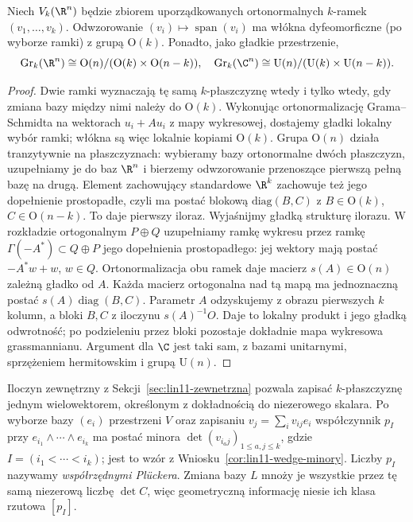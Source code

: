 \begin{stwierdzenie}
\label{prop:lin29-grass-stiefel}
Niech $V_k(\R^n)$ będzie zbiorem uporządkowanych
ortonormalnych $k$-ramek $(v_1,\ldots,v_k)$.
Odwzorowanie $(v_i)\mapsto\operatorname{span}(v_i)$ ma włókna dyfeomorficzne (po wyborze ramki)
z grupą $\mathrm O(k)$.
Ponadto, jako gładkie przestrzenie,
\[
 \operatorname{Gr}_k(\R^n)
   \cong\mathrm O(n)/(\mathrm O(k)\times\mathrm O(n-k)),
\quad
 \operatorname{Gr}_k(\C^n)
   \cong\mathrm U(n)/(\mathrm U(k)\times\mathrm U(n-k)).
\]
\end{stwierdzenie}
\begin{proof}
Dwie ramki wyznaczają tę samą $k$-płaszczyznę wtedy
i tylko wtedy, gdy zmiana bazy między nimi należy do
$\mathrm O(k)$. Wykonując ortonormalizację Grama--Schmidta
na wektorach $u_i+Au_i$ z mapy wykresowej, dostajemy
gładki lokalny wybór ramki; włókna są więc lokalnie
kopiami $\mathrm O(k)$. Grupa $\mathrm O(n)$ działa
tranzytywnie na płaszczyznach: wybieramy bazy ortonormalne
dwóch płaszczyzn, uzupełniamy je do baz $\R^n$ i bierzemy
odwzorowanie przenoszące pierwszą pełną bazę na drugą.
Element zachowujący standardowe $\R^k$ zachowuje też
jego dopełnienie prostopadłe, czyli ma postać blokową
$\mathrm{diag}(B,C)$ z $B\in\mathrm O(k)$,
$C\in\mathrm O(n-k)$. To daje pierwszy iloraz.
Wyjaśnijmy gładką strukturę ilorazu. W rozkładzie ortogonalnym
$P\oplus Q$ uzupełniamy ramkę wykresu przez ramkę
$\Gamma(-A^*)\subset Q\oplus P$ jego dopełnienia prostopadłego:
jej wektory mają postać $-A^*w+w$, $w\in Q$.
Ortonormalizacja obu ramek daje macierz $s(A)\in\mathrm O(n)$
zależną gładko od $A$. Każda macierz ortogonalna nad tą mapą
ma jednoznaczną postać $s(A)\operatorname{diag}(B,C)$.
Parametr $A$ odzyskujemy z obrazu pierwszych $k$ kolumn,
a bloki $B,C$ z iloczynu $s(A)^{-1}O$. Daje to lokalny
produkt i jego gładką odwrotność; po podzieleniu przez bloki
pozostaje dokładnie mapa wykresowa grassmannianu.
Argument dla $\C$ jest taki sam, z bazami unitarnymi,
sprzężeniem hermitowskim i grupą $\mathrm U(n)$.
\end{proof}

Iloczyn zewnętrzny z Sekcji~\ref{sec:lin11-zewnetrzna}
pozwala zapisać $k$-płaszczyznę jednym wielowektorem,
określonym z dokładnością do niezerowego skalara.
Po wyborze bazy $(e_i)$ przestrzeni $V$ oraz zapisaniu
$v_j=\sum_i v_{ij}e_i$ współczynnik
$p_I$ przy $e_{i_1}\wedge\cdots\wedge e_{i_k}$
ma postać minora
$\det(v_{i_a j})_{1\leq a,j\leq k}$, gdzie
$I=(i_1<\cdots<i_k)$; jest to
wzór z Wniosku~\ref{cor:lin11-wedge-minory}.
Liczby $p_I$ nazywamy \emph{współrzędnymi Plückera}.
Zmiana bazy $L$ mnoży je wszystkie przez tę samą
niezerową liczbę $\det C$, więc geometryczną informację
niesie ich klasa rzutowa $[p_I]$.

